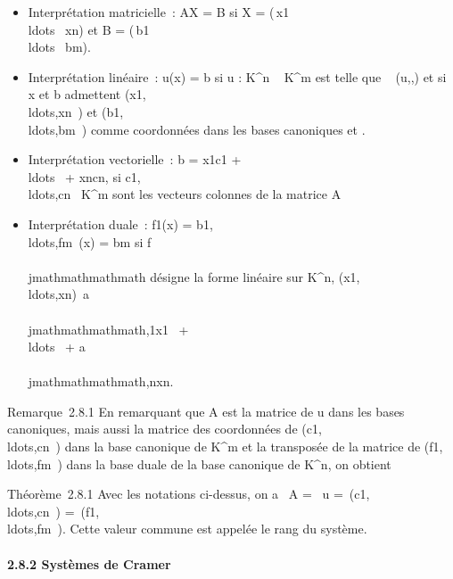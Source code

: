\begin{itemize}
\itemsep1pt\parskip0pt
\item
  Interprétation matricielle~: AX = B si X = \left
  (\matrix\,x1
  \cr
  \\ldots~
  \cr xn\right ) et B =
  \left
  (\matrix\,b1
  \cr
  \\ldots~
  \cr bm\right ).
\item
  Interprétation linéaire~: u(x) = b si u : K^n \rightarrow~
  K^m est telle que
  \mathrmMat~
  (u,\textCann,\textCanm)
  et si x et b admettent
  (x1,\\ldots,xn~)
  et
  (b1,\\ldots,bm~)
  comme coordonnées dans les bases canoniques
  \textCann et
  \textCanm.
\item
  Interprétation vectorielle~: b = x1c1 +
  \\ldots~ +
  xncn, si
  c1,\\ldots,cn~
  \in K^m sont les vecteurs colonnes de la matrice A
\item
  Interprétation duale~: f1(x) =
  b1,\\ldots,fm~(x)
  = bm si f\\\\jmathmathmathmath désigne la forme linéaire sur
  K^n,
  (x1,\\ldots,xn)\mapsto~a\\\\jmathmathmathmath,1x1~
  + \\ldots~ +
  a\\\\jmathmathmathmath,nxn.
\end{itemize}

Remarque~2.8.1 En remarquant que A est la matrice de u dans les bases
canoniques, mais aussi la matrice des coordonnées de
(c1,\\ldots,cn~)
dans la base canonique de K^m et la transposée de la matrice
de
(f1,\\ldots,fm~)
dans la base duale de la base canonique de K^n, on obtient

Théorème~2.8.1 Avec les notations ci-dessus, on a
\mathrmrg~A
= \mathrmrg~u
=\
\mathrmrg(c1,\\ldots,cn~)
=\
\mathrmrg(f1,\\ldots,fm~).
Cette valeur commune est appelée le rang du système.

\paragraph{2.8.2 Systèmes de Cramer}

